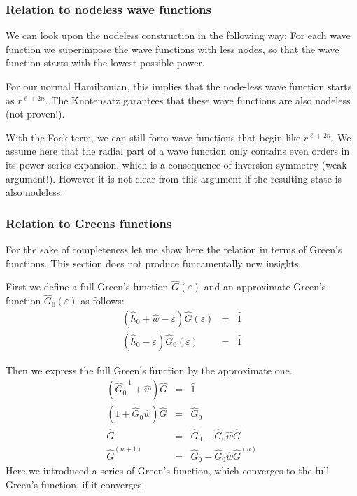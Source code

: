 \documentclass[11pt,a4paper]{report}
\begin{document}
\subsubsection{Relation to nodeless wave functions}
We can look upon the nodeless construction in the following way: For
each wave function we superimpose the wave functions with less nodes,
so that the wave function starts with the lowest possible power.

For our normal Hamiltonian, this implies that the node-less wave
function starts as $r^{\ell+2n}$. The Knotensatz garantees that these
wave functions are also nodeless (not proven!).

With the Fock term, we can still form wave functions that begin like
$r^{\ell+2n}$. We assume here that the radial part of a wave function
only contains even orders in its power series expansion, which is a
consequence of inversion symmetry (weak argument!). However it is not
clear from this argument if the resulting state is also nodeless.





\subsubsection{Relation to Greens functions}
For the sake of completeness let me show here the relation in terms of
Green's functions. This section does not produce funcamentally new
insights.

First we define a full Green's function $\hat{G}(\varepsilon)$ and an
approximate Green's function $\hat{G}_0(\varepsilon)$ as follows:
\begin{eqnarray*}
\left(\hat{h}_0+\hat{w}-\varepsilon\right)\hat{G}(\varepsilon)&=&\hat{1}
\\
\left(\hat{h}_0-\varepsilon\right)\hat{G}_0(\varepsilon)&=&\hat{1}
\end{eqnarray*}

Then we express the full Green's function by the approximate one.
\begin{eqnarray*}
(\hat{G}_0^{-1}+\hat{w})\hat{G}&=&\hat{1}
\\
(1+\hat{G}_0\hat{w})\hat{G}&=&\hat{G}_0
\\
\hat{G}&=&\hat{G}_0-\hat{G}_0\hat{w}\hat{G}
\\
\hat{G}^{(n+1)}&=&\hat{G}_0-\hat{G}_0\hat{w}\hat{G}^{(n)}
\end{eqnarray*}
Here we introduced a series of Green's function, which converges to
the full Green's function, if it converges.
\end{document}
